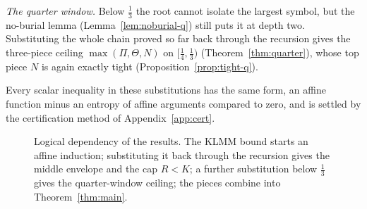 \documentclass[journal]{IEEEtran}
\theoremstyle{definition}
\begin{document}
\emph{The quarter window.} Below $\tfrac13$ the root cannot isolate the largest
symbol, but the no-burial lemma (Lemma~\ref{lem:noburial-q}) still puts it at
depth two. Substituting the whole chain proved so far back through the recursion
gives the three-piece ceiling $\max(\Pi,\Theta,N)$ on $[\tfrac14,\tfrac13)$
(Theorem~\ref{thm:quarter}), whose top piece $N$ is again exactly tight
(Proposition~\ref{prop:tight-q}).

Every scalar inequality in these substitutions has the same form, an affine
function minus an entropy of affine arguments compared to zero, and is settled
by the certification method of Appendix~\ref{app:cert}.

\begin{figure}[t]
\centering
\footnotesize
{}
\caption{Logical dependency of the results. The KLMM bound starts an affine
induction; substituting it back through the recursion gives the middle envelope
and the cap $R<K$; a further substitution below $\tfrac13$ gives the
quarter-window ceiling; the pieces combine into Theorem~\ref{thm:main}.}
\label{fig:dep}
\end{figure}
\end{document}
